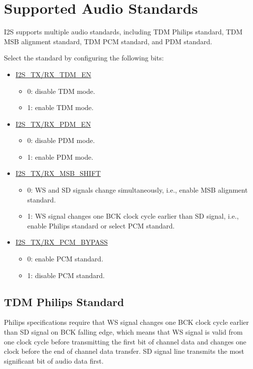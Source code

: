 \documentclass[main\_\_CN.tex]{subfiles}
\begin{document}
\section{Supported Audio Standards} \label{I2S_supported_protocal}

\chipname{} I2S supports multiple audio standards, including TDM Philips standard, TDM MSB alignment standard, TDM PCM standard, and PDM standard.

Select the standard by configuring the following bits:
\begin{itemize}
    \item \hyperref[fielddesc:I2SRXMSBSHIFT]{I2S\_TX/RX\_TDM\_EN}
    \begin{itemize}
        \item 0: disable TDM mode.
        \item 1: enable TDM mode.
    \end{itemize}
    \item \hyperref[fielddesc:I2SRXMSBSHIFT]{I2S\_TX/RX\_PDM\_EN}
    \begin{itemize}
        \item 0: disable PDM mode.
        \item 1: enable PDM mode.
    \end{itemize}
    \item \hyperref[fielddesc:I2SRXMSBSHIFT]{I2S\_TX/RX\_MSB\_SHIFT}
    \begin{itemize}
        \item 0: WS and SD signals change simultaneously, i.e., enable MSB alignment standard.
        \item 1: WS signal changes one BCK clock cycle earlier than SD signal, i.e., enable Philips standard or select PCM standard.
    \end{itemize}
    \item \hyperref[fielddesc:I2SRXPCMBYPASS]{I2S\_TX/RX\_PCM\_BYPASS}
    \begin{itemize}
        \item 0: enable PCM standard.
        \item 1: disable PCM standard.
    \end{itemize}
\end{itemize}

\subsection{TDM Philips Standard}

Philips specifications require that WS signal changes one BCK clock cycle earlier than SD signal on BCK falling edge, which means that WS signal is valid from one clock cycle before transmitting the first bit of channel data and changes one clock before the end of channel data transfer. SD signal line transmits the most significant bit of audio data first.
\end{document}
